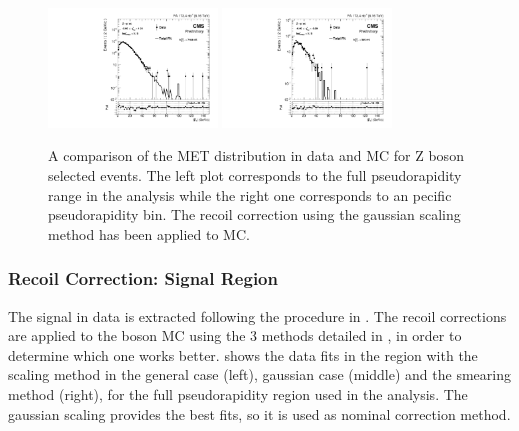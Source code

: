 \begin{figure}[!h]
 \begin{center}
  \includegraphics[width=0.4\textwidth]{Figures/WBoson/Analysis/Correction/Recoil/CheckFits/Z/Recoil_ScalingGauss/PLOT_MET_DATA_ZToMuMi_PA_Model_TEMP_DY_MuEtaCM_m286_193_MuIso_0_15.pdf}
  \includegraphics[width=0.4\textwidth]{Figures/WBoson/Analysis/Correction/Recoil/CheckFits/Z/Recoil_ScalingGauss/PLOT_MET_DATA_ZToMuMi_PA_Model_TEMP_DY_MuEtaCM_m40_m20_MuIso_0_15.pdf} 
  \caption{A comparison of the MET distribution in data and MC for Z boson selected events. The left plot corresponds to the full pseudorapidity range in the analysis while the right one corresponds to an pecific pseudorapidity bin. The recoil correction using the gaussian scaling method has been applied to MC.}
 \label{fig:recoilClosure}
 \end{center}
\end{figure}

\subsubsection{Recoil Correction: Signal Region}\label{sec:WBoson_Corrections_MET_RecoilSignal}

The \W signal in data is extracted following the procedure in . The recoil corrections are applied to the \W boson MC using the 3 methods detailed in , in order to determine which one works better.  shows the data fits in the \W region with the scaling method in the general case (left), gaussian case (middle) and the smearing method (right), for the full pseudorapidity region used in the analysis. The gaussian scaling provides the best fits, so it is used as nominal correction method.

